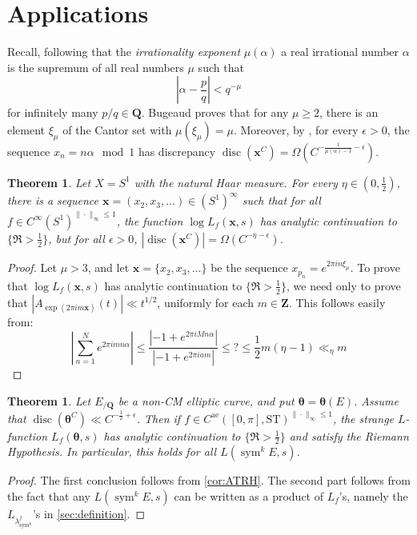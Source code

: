 \documentclass{article}
\DeclareMathOperator{\disc}{disc}
\DeclareMathOperator{\sym}{sym}
\newcommand{\bQ}{\mathbf{Q}}
\newcommand{\btheta}{{\boldsymbol{\theta}}}
\newcommand{\bx}{{\boldsymbol x}}
\newcommand{\bZ}{\mathbf{Z}}
\newcommand{\alev}{\mathrm{ae}}
\newcommand{\ST}{\mathrm{ST}}
\newtheorem{theorem}[subsection]{Theorem}
\theoremstyle{definition}
\begin{document}
\section{Applications}\label{sec:application}


Recall, following \cite{bugeaud-2008} that the \emph{irrationality exponent} 
$\mu(\alpha)$ a real irrational number $\alpha$ is the supremum of all real 
numbers $\mu$ such that 
\[
	\left|\alpha-\frac{p}{q}\right| < q^{-\mu}
\]
for infinitely many $p/q\in \bQ$. Bugeaud proves that for any 
$\mu\geqslant 2$, there is an element $\xi_\mu$ of the Cantor set with 
$\mu(\xi_\mu)=\mu$. Moreover, by \cite[?]{kuipers-niederreiter-1974}, for 
every $\epsilon>0$, the sequence $x_n=n\alpha\mod 1$ has discrepancy 
$\disc(\bx^C)=\Omega(C^{-\frac{1}{\mu(\alpha)-1}-\epsilon})$. 

\begin{theorem}
Let $X=S^1$ with the natural Haar measure. For every $\eta\in (0,\frac 1 2)$, 
there is a sequence $\bx=(x_2,x_3,\dots)\in (S^1)^\infty$ such that for all 
$f\in C^\infty(S^1)^{\|\cdot\|_\infty\leqslant 1}$, the function 
$\log L_f(\bx,s)$ has analytic continuation to $\{\Re>\frac 1 2\}$, but for 
all $\epsilon>0$, $|\disc(\bx^C)|=\Omega(C^{-\eta-\epsilon})$. 
\end{theorem}
\begin{proof}
Let $\mu>3$, and let 
$\bx=\{x_2,x_3,\dots\}$ be the sequence $x_{p_n}=e^{2\pi i n \xi_\mu}$. To 
prove that $\log L_f(\bx,s)$ has analytic continuation to $\{\Re >\frac 1 2\}$, 
we need only to prove that $|A_{\exp(2\pi i m \bx)}(t)| \ll t^{1/2}$, uniformly 
for each $m\in \bZ$. This follows easily from:
\[
	\left| \sum_{n=1}^N e^{2\pi i m n \alpha}\right| \leqslant \frac{|-1+e^{2\pi i M n \alpha}|}{|-1+e^{2\pi i a m}|} \leqslant ? \leqslant \frac 1 2 m (\eta-1) \ll_\eta m
\]
\end{proof}

\begin{theorem}
Let $E_{/\bQ}$ be a non-CM elliptic curve, and put $\btheta=\btheta(E)$. 
Assume that $\disc(\btheta^C) \ll C^{-\frac 1 2+\epsilon}$. Then if 
$f\in C^\alev([0,\pi],\ST)^{\|\cdot\|_\infty\leqslant 1}$, the strange 
$L$-function $L_f(\btheta,s)$ has analytic continuation to 
$\{\Re >\frac 1 2\}$ and satisfy the Riemann Hypothesis. In particular, 
this holds for all $L(\sym^k E,s)$. 
\end{theorem}
\begin{proof}
The first conclusion follows from \autoref{cor:ATRH}. The second part follows 
from the fact that any $L(\sym^k E,s)$ can be written as a product of $L_f$'s, 
namely the $L_{\lambda_{\sym^k}^j}$'s in \autoref{sec:definition}.  
\end{proof}
\end{document}
